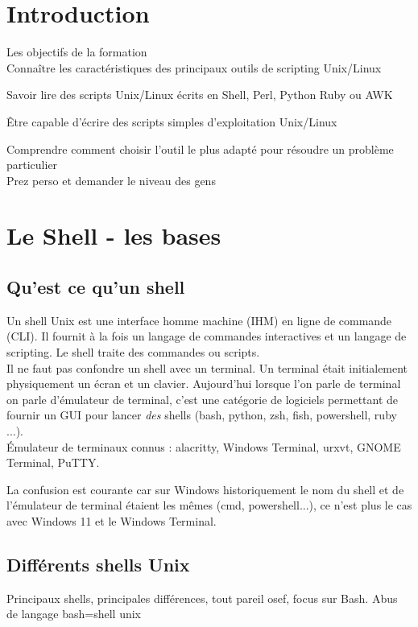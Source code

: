 \documentclass[11pt,a4paper]{article}
\begin{document}
\tableofcontents
\section{Introduction}

Les objectifs de la formation\\ 

Connaître les caractéristiques des principaux outils de scripting Unix/Linux

Savoir lire des scripts Unix/Linux écrits en Shell, Perl, Python Ruby ou AWK

Être capable d'écrire des scripts simples d'exploitation Unix/Linux

Comprendre comment choisir l'outil le plus adapté pour résoudre un problème particulier
\\

Prez perso et demander le niveau des gens

\section{Le Shell - les bases}

\subsection{Qu'est ce qu'un shell}

Un shell Unix est une interface homme machine (IHM) en ligne de commande (CLI). Il fournit à la fois un langage de commandes interactives et un langage de scripting. Le shell traite des commandes ou scripts.\\ 
Il ne faut pas confondre un shell avec un terminal. Un terminal était initialement physiquement un écran et un clavier. Aujourd'hui lorsque l'on parle de terminal on parle d'émulateur de terminal, c'est une catégorie de logiciels permettant de fournir un GUI pour lancer \textit{des} shells (bash, python, zsh, fish, powershell, ruby ...). \\ 
\'Emulateur de terminaux connus : alacritty, Windows Terminal, urxvt, GNOME Terminal, PuTTY.

La confusion est courante car sur Windows historiquement le nom du shell et de l'émulateur de terminal étaient les mêmes (cmd, powershell...), ce n'est plus le cas avec Windows 11 et le Windows Terminal.\\


\subsection{Différents shells Unix}
Principaux shells, principales différences, tout pareil osef, focus sur Bash.
Abus de langage bash=shell unix
\end{document}
